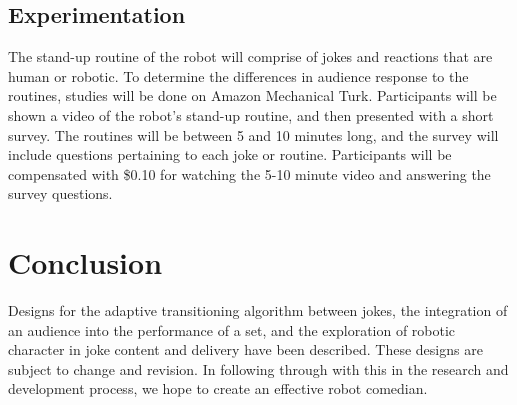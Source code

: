 \documentclass[onecolumn, draftclsnofoot,10pt, compsoc]{IEEEtran}
\begin{document}
\subsection{Experimentation}
The stand-up routine of the robot will comprise of jokes and reactions that are human or robotic.
To determine the differences in audience response to the routines, studies will be done on Amazon Mechanical Turk.
Participants will be shown a video of the robot’s stand-up routine, and then presented with a short survey.
The routines will be between 5 and 10 minutes long, and the survey will include questions pertaining to each joke or routine.
Participants will be compensated with \$0.10 for watching the 5-10 minute video and answering the survey questions.

\section{Conclusion}
  Designs for the adaptive transitioning algorithm between jokes, the integration of an audience into the performance of a set, and the exploration of robotic character in joke content and delivery have been described. These designs are subject to change and revision. In following through with this in the research and development process, we hope to create an effective robot comedian.



\pagebreak

\pagebreak
\clearpage
\end{document}
